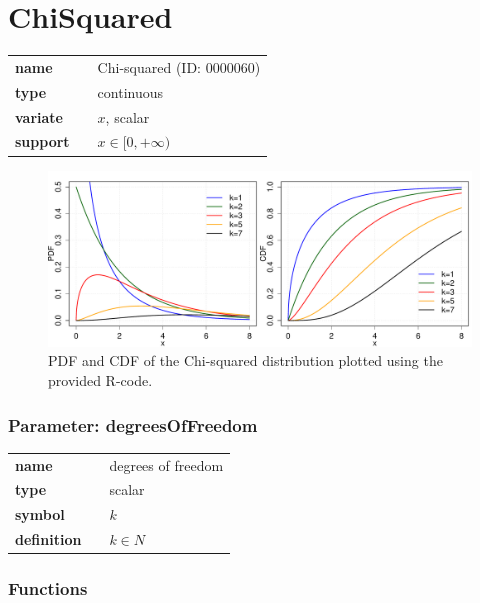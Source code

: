 \smallskip\section*{ChiSquared} 

  \bigskip 

\begin{tabular}{p{2cm}cl}
\textbf{name} & & Chi-squared (ID: 0000060)\\ 
 
\textbf{type} & & continuous \\ 

\textbf{variate} & & $x$, scalar \\ 

\textbf{support} & & $x \in [0,+\infty)$
\end{tabular}

\begin{figure}[htb!]
\centering
  \includegraphics[width=140mm]{pics/ChiSquared_pdf_cdf.pdf}
 \caption{PDF and CDF of the Chi-squared distribution plotted using the provided R-code.}
 \label{fig:ChiSquared_pdf_cdf}
\end{figure}

\subsubsection*{Parameter: degreesOfFreedom}

\noindent\begin{tabular}{p{2cm}cl}
\textbf{name} & & degrees of freedom \\
\textbf{type} & & scalar \\
\textbf{symbol} & & $k$  \\
\textbf{definition} & & $k \in N$
\end{tabular}
\subsubsection*{Functions}

